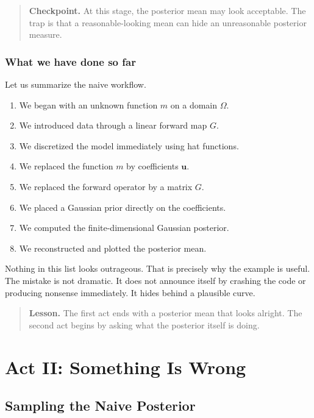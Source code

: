 \documentclass[11pt,a4paper]{book}
\newenvironment{lesson}
  {\begin{quote}\textbf{Lesson.}}
  {\end{quote}}
\newenvironment{checkpoint}
  {\begin{quote}\textbf{Checkpoint.}}
  {\end{quote}}
\newcommand{\G}{G}
\begin{document}
\begin{checkpoint}
At this stage, the posterior mean may look acceptable.
The trap is that a reasonable-looking mean can hide an unreasonable posterior measure.
\end{checkpoint}

\section{What we have done so far}

Let us summarize the naive workflow.

\begin{enumerate}[label=\arabic*.]
    \item We began with an unknown function $m$ on a domain $\Omega$.
    \item We introduced data through a linear forward map $\G$.
    \item We discretized the model immediately using hat functions.
    \item We replaced the function $m$ by coefficients $\bm{u}$.
    \item We replaced the forward operator by a matrix $G$.
    \item We placed a Gaussian prior directly on the coefficients.
    \item We computed the finite-dimensional Gaussian posterior.
    \item We reconstructed and plotted the posterior mean.
\end{enumerate}

Nothing in this list looks outrageous. That is precisely why the example is
useful. The mistake is not dramatic. It does not announce itself by crashing the
code or producing nonsense immediately. It hides behind a plausible curve.

\begin{lesson}
The first act ends with a posterior mean that looks alright.
The second act begins by asking what the posterior itself is doing.
\end{lesson}


\part{Act II: Something Is Wrong}

\chapter{Sampling the Naive Posterior}
\end{document}
